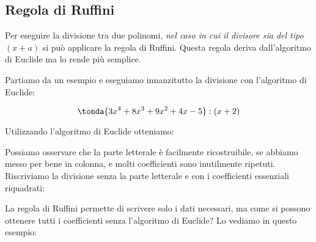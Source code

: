 \subsection{Regola di Ruffini}
\label{subsec:divpol_divisione_ruffini}

Per eseguire la divisione tra due polinomi, \emph{nel caso in cui il
divisore sia del tipo \((x+a)\)} si può applicare la regola di Ruffini.
Questa regola deriva dall'algoritmo di Euclide ma lo rende più semplice.

% 

Partiamo da un esempio e eseguiamo innanzitutto la divisione con l'algoritmo 
di Euclide:


\[\tonda{3 x^4 +8 x^3 +9 x^2 +4 x -5} : (x + 2)\]

Utilizzando l'algoritmo di Euclide otteniamo:

{\ruffinia}

Possiamo osservare che la parte letterale è facilmente ricostruibile, se 
abbiamo messo per bene in colonna, e molti coefficienti sono inutilmente 
ripetuti. Riscriviamo la divisione senza la parte letterale e con i
coefficienti essenziali riquadrati:

La regola di Ruffini permette di scrivere solo i dati necessari,
ma come si possono ottenere tutti i coefficienti senza l'algoritmo di Euclide?
Lo vediamo in questo esempio:

